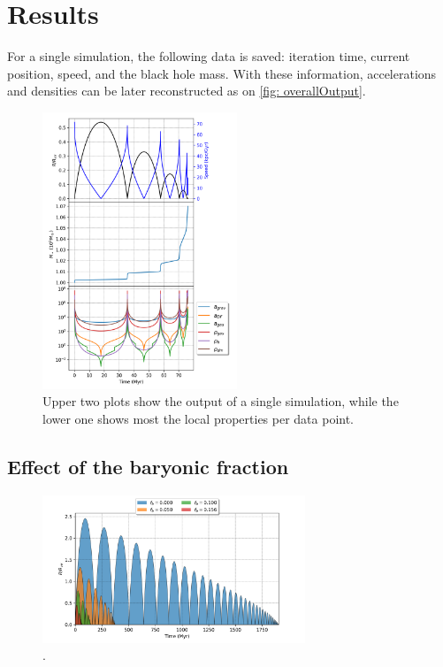 	\section{Results}
	For a single simulation, the following data is saved: iteration time, current position, speed, and the black hole mass. With these information, accelerations and densities can be later reconstructed as on \autoref{fig: overallOutput}.
	\begin{figure}[h]
		\centering
		\includegraphics[width = 0.52\textwidth]{"../Files/Week 6/properties_s01v70"}
		\caption{Upper two plots show the output of a single simulation, while the lower one shows most the local properties per data point.}
		\label{fig: overallOutput}
	\end{figure}
	
	\subsection{Effect of the baryonic fraction}
	\begin{figure}[h]
		\centering
		\includegraphics[width = 0.7\textwidth]{"../Files/Week 5/baryonic_fraction_comparison"}
		\caption{.}
		\label{fig: baryonicfraction}
	\end{figure}
		
